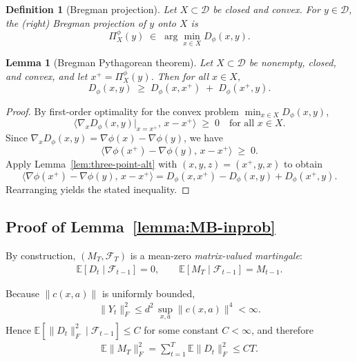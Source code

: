 \documentclass[11pt,letterpaper]{article}
\newcommand{\cfeat}{c}
\theoremstyle{plain}
\newtheorem{lemma}{Lemma}
\newtheorem{definition}{Definition}
\theoremstyle{definition}  %
\begin{document}
\begin{definition}[Bregman projection]
Let $X\subset\mathcal{D}$ be closed and convex.
For $y\in\mathcal{D}$, the (right) Bregman projection of $y$ onto $X$ is
\[
\Pi_X^\phi(y) \;\in\; \arg\min_{x\in X} D_\phi(x,y).
\]
\end{definition}

\begin{lemma}[Bregman Pythagorean theorem]
\label{lem:pythagoras}
Let $X\subset\mathcal{D}$ be nonempty, closed, and convex, and let $x^+=\Pi_X^\phi(y)$.
Then for all $x\in X$,
\[
D_\phi(x,y) \;\ge\; D_\phi(x,x^+) \;+\; D_\phi(x^+,y).
\]
\end{lemma}

\begin{proof}
By first-order optimality for the convex problem $\min_{x\in X} D_\phi(x,y)$,
\[
\big\langle \nabla_x D_\phi(x,y)\big|_{x=x^+},\, x-x^+ \big\rangle \;\ge\; 0
\quad\text{for all } x\in X.
\]
Since $\nabla_x D_\phi(x,y)=\nabla\phi(x)-\nabla\phi(y)$, we have
\[
\big\langle \nabla\phi(x^+)-\nabla\phi(y),\, x-x^+ \big\rangle \;\ge\; 0.
\]
Apply Lemma~\ref{lem:three-point-alt} with $(x,y,z)=(x^+,y,x)$ to obtain
\[
\big\langle \nabla\phi(x^+)-\nabla\phi(y),\, x-x^+ \big\rangle
= D_\phi(x,x^+) - D_\phi(x,y) + D_\phi(x^+,y).
\]
Rearranging yields the stated inequality.
\end{proof}


\subsection*{Proof of Lemma~\ref{lemma:MB-inprob}}
\noindent 
By construction, $(M_T,\mathcal{F}_T)$ is a mean-zero
\emph{matrix-valued martingale}:
\begin{align*}
  \mathbb{E}[D_t\mid \mathcal{F}_{t-1}] = 0,
\qquad
\mathbb{E}[M_T\mid \mathcal{F}_{t-1}] = M_{t-1}.  
\end{align*}

\noindent Because $\|\cfeat(x,a)\|$ is uniformly bounded,
\begin{align*}
    \|Y_t\|_F^2 \le d^2\,\sup_{x,a}\|\cfeat(x,a)\|^4 < \infty.
\end{align*}
Hence
$\mathbb{E}[\|D_t\|_F^2 \mid \mathcal{F}_{t-1}] \le C$ for some constant $C<\infty$,
and therefore
\begin{align*}
  \mathbb{E}\|M_T\|_F^2 = \sum_{t=1}^T \mathbb{E}\|D_t\|_F^2 \le CT.  
\end{align*}
\end{document}

